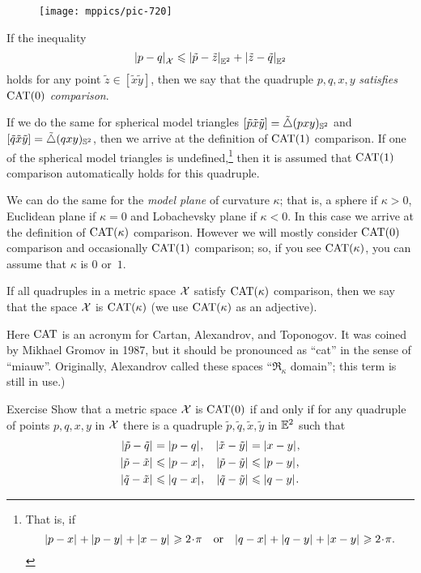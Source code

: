 \begin{wrapfigure}{r}{25mm}
\vskip-4mm
\centering
\texttt{[image: mppics/pic-720]}
\end{wrapfigure}

If the inequality
\[\dist{p}{q}{\spc{X}}\le \dist{\tilde p}{\tilde z}{\EE^2}+\dist{\tilde z}{\tilde q}{\EE^2}\]
holds for any point $\tilde z\in [\tilde x\tilde y]$, then we say that 
the quadruple $p,q,x,y$ \emph{satisfies $\mathrm{CAT}(0)$ comparison}.
\label{page:CAT-comparison}


If we do the same for spherical model triangles  
$[\tilde p\tilde x\tilde y]=\tilde\triangle{}(pxy)_{\mathbb{S}^2}$ 
and 
$[\tilde q\tilde x\tilde y]=\tilde\triangle{}(qxy)_{\mathbb{S}^2}$,
then we arrive at the definition of $\mathrm{CAT}(1)$ comparison.
If one of the spherical model triangles is undefined,\footnote{That is, if 
\[\dist{p}{x}{}+\dist{p}{y}{}+\dist{x}{y}{}\ge 2\cdot\pi
\quad
\text{or}
\quad
\dist{q}{x}{}+\dist{q}{y}{}+\dist{x}{y}{}\ge 2\cdot\pi.\]}
then it is assumed that $\mathrm{CAT}(1)$ comparison automatically holds for this quadruple.

We can do the same for the \emph{model plane} of curvature $\kappa$;
that is, a sphere if $\kappa>0$, 
Euclidean plane if $\kappa=0$ 
and Lobachevsky plane if $\kappa<0$.
In this case we arrive at the definition of $\mathrm{CAT}(\kappa)$ comparison.
However we will mostly consider $\mathrm{CAT}(0)$ comparison and occasionally $\mathrm{CAT}(1)$ comparison;
so, if you see $\mathrm{CAT}(\kappa)$, you can assume that $\kappa$ is $0$ or~$1$.

If all quadruples in a metric space $\mathcal{X}$ satisfy $\mathrm{CAT}(\kappa)$ comparison, then we say that the space $\mathcal{X}$ is $\mathrm{CAT}(\kappa)$
(we use $\mathrm{CAT}(\kappa)$ as an adjective).

Here $\mathrm{CAT}$ is an acronym for Cartan, Alexandrov, and Toponogov.
It was coined by Mikhael Gromov in 1987,
but it should be pronounced as ``cat'' in the sense of ``miauw''.
Originally, Alexandrov called these spaces ``$\mathfrak{R}_\kappa$ domain'';
this term is still in use.)

\begin{thm}{Exercise}\label{ex:sba-2+2-short}
Show that a metric space $\mathcal{X}$ is $\mathrm{CAT}(0)$
if and only if for any quadruple of points 
$p,q,x,y$ in $\mathcal{X}$ 
there is a quadruple $\tilde p,\tilde q,\tilde x,\tilde y$ in $\mathbb{E}^2$
such that 
\begin{align*}
\dist{\tilde p}{\tilde q}{}&=\dist{p}{q}{},
&
\dist{\tilde x}{\tilde y}{}&=\dist{x}{y}{},
\\
\dist{\tilde p}{\tilde x}{}&\le \dist{p}{x}{},
&
\dist{\tilde p}{\tilde y}{}&\le \dist{p}{y}{},
\\
\dist{\tilde q}{\tilde x}{}&\le \dist{q}{x}{},
&
\dist{\tilde q}{\tilde y}{}&\le \dist{q}{y}{}.
\end{align*}

\end{thm}

